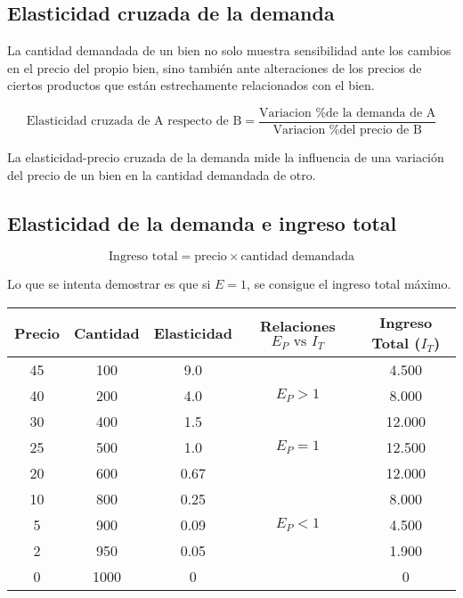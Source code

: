 \subsection{Elasticidad cruzada de la demanda}

La cantidad demandada de un bien no solo muestra sensibilidad ante los cambios en el precio del propio bien,
sino también ante alteraciones de los precios de ciertos productos que están estrechamente relacionados con el bien.

\begin{equation*}
    \text{Elasticidad cruzada de A respecto de B} = \frac{\text{Variacion \% de la demanda de A}}{\text{Variacion \% del precio de B}}
\end{equation*}

La elasticidad-precio cruzada de la demanda mide la influencia de una variación del precio de un bien en la cantidad demandada de otro.

\subsection{Elasticidad de la demanda e ingreso total}

\begin{equation*}
    \text{Ingreso total} = \text{precio} \times \text{cantidad demandada}
\end{equation*}

Lo que se intenta demostrar es que si \(E = 1\),
se consigue el ingreso total máximo.

\begin{table}[H]
    \centering
    \begin{tabular}{ccccc}
        \hline
        Precio & Cantidad & Elasticidad & Relaciones \(E_P \text{ vs } I_T\) & Ingreso Total (\(I_T\)) \\
        \hline
        45     & 100      & 9.0         &                                    & 4.500                   \\
        40     & 200      & 4.0         & \(E_P > 1\)                        & 8.000                   \\
        30     & 400      & 1.5         &                                    & 12.000                  \\
        25     & 500      & 1.0         & \(E_P = 1\)                        & 12.500                  \\
        20     & 600      & 0.67        &                                    & 12.000                  \\
        10     & 800      & 0.25        &                                    & 8.000                   \\
        5      & 900      & 0.09        & \(E_P < 1\)                        & 4.500                   \\
        2      & 950      & 0.05        &                                    & 1.900                   \\
        0      & 1000     & 0           &                                    & 0                       \\
        \hline
    \end{tabular}
\end{table}

